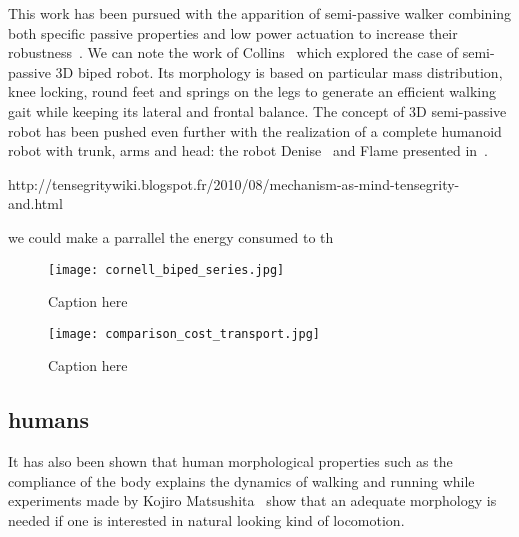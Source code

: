 \begin{figure}[]
\centering
    \hfil
    \caption{}
    \label{fig:mcgeer_work}
\end{figure}

This work has been pursued with the apparition of semi-passive walker combining both specific passive properties and low power actuation to increase their robustness~\cite{Anderson2005}.
We can note the work of Collins~\cite{collins2005bipedal} which explored the case of semi-passive 3D biped robot.
Its morphology is based on particular mass distribution, knee locking, round feet and springs on the legs to generate an efficient walking gait while keeping its lateral and frontal balance.
The concept of 3D semi-passive robot has been pushed even further with the realization of a complete humanoid robot with trunk, arms and head: the robot Denise~\cite{wisse2005three} and Flame presented in~\cite{Hobbelen2008}.

http://tensegritywiki.blogspot.fr/2010/08/mechanism-as-mind-tensegrity-and.html

we could make a parrallel the energy consumed to th
\begin{figure}[]
    \begin{center}
        \texttt{[image: cornell\_biped\_series.jpg]}
    \end{center}
    \caption{Caption here}
    \label{fig:figure1}
\end{figure}

\begin{figure}[]
    \begin{center}
        \texttt{[image: comparison\_cost\_transport.jpg]}
    \end{center}
    \caption{Caption here}
    \label{fig:figure1}
\end{figure}

\subsection{humans} %
\label{sub:humans}

It has also been shown that human morphological properties such as the compliance of the body explains the dynamics of walking and running \cite{Geyer2006} while experiments made by Kojiro Matsushita~\cite{matsushita2005locomoting} show that an adequate morphology is needed if one is interested in natural looking kind of locomotion.


